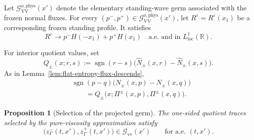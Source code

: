 \documentclass[11pt]{amsart}
\numberwithin{equation}{section}
\theoremstyle{plain}
\newtheorem{proposition}[theorem]{Proposition}
\theoremstyle{definition}
\theoremstyle{remark}
\begin{document}
Let \(\mathcal G_{\mathrm{VV}}^{o,\mathrm{phys}}(x')\) denote the elementary
standing-wave germ associated with the frozen normal fluxes. For every
\((p^-,p^+)\in\mathcal G_{\mathrm{VV}}^{o,\mathrm{phys}}(x')\), let
\(R^\varepsilon=R^\varepsilon(x_1)\) be a corresponding frozen standing
profile. It satisfies
\begin{equation}
\label{eq:flat-frozen-profile-convergence}
    R^\varepsilon
    \longrightarrow
    p^-H(-x_1)+p^+H(x_1)
    \quad
    \text{a.e. and in }L^1_{\mathrm{loc}}(\mathbb R).
\end{equation}

For interior quotient values, set
\begin{equation}
\label{eq:flat-interior-reduced-normal-entropy-fluxes}
    Q_\pm(x;r,s)
    :=
    \operatorname{sgn}(r-s)
    \bigl(
        \widehat N_\pm(x,r)-\widehat N_\pm(x,s)
    \bigr).
\end{equation}
As in Lemma~\ref{lem:flat-entropy-flux-descends},
\begin{equation}
\label{eq:flat-interior-entropy-flux-descends}
\begin{aligned}
&\operatorname{sgn}(p-q)
\bigl(N_\pm(x,p)-N_\pm(x,q)\bigr)
\\
&\qquad=
Q_\pm
\bigl(x;\Pi^\pm(x,p),\Pi^\pm(x,q)\bigr).
\end{aligned}
\end{equation}

\begin{proposition}[Selection of the projected germ]
\label{prop:flat-projected-germ-selection}
The one-sided quotient traces selected by the pure-viscosity approximation
satisfy
\begin{equation}
\label{eq:flat-selected-projected-germ}
    \bigl(z^-_\Gamma(t,x'),z^+_\Gamma(t,x')\bigr)
    \in
    \mathcal G_{\mathrm{vv}}(x')
    \qquad
    \text{for a.e. }(t,x').
\end{equation}
\end{proposition}
\end{document}
